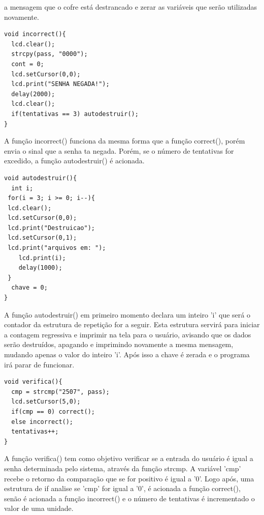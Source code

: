 \documentclass[conference]{IEEEtran}
\begin{document}
        a mensagem que o cofre está destrancado e zerar as variáveis
        que serão utilizadas novamente.        
        \begin{lstlisting}
void incorrect(){
  lcd.clear();
  strcpy(pass, "0000");
  cont = 0;
  lcd.setCursor(0,0);
  lcd.print("SENHA NEGADA!");
  delay(2000);
  lcd.clear();
  if(tentativas == 3) autodestruir();
}
        \end{lstlisting}
        A função incorrect() funciona da mesma forma que a função correct(), porém envia o sinal que a senha ta negada. Porém, se o número de tentativas for excedido, a função autodestruir() é acionada.
        \begin{lstlisting}
void autodestruir(){
  int i;
 for(i = 3; i >= 0; i--){ 
 lcd.clear();
 lcd.setCursor(0,0);
 lcd.print("Destruicao");
 lcd.setCursor(0,1);
 lcd.print("arquivos em: ");
 	lcd.print(i);
   	delay(1000);
 }
  chave = 0;
}
        \end{lstlisting}
        A função autodestruir() em primeiro momento declara um
        inteiro ’i’ que será o contador da estrutura de repetição for a
        seguir. Esta estrutura servirá para iniciar a contagem regressiva
        e imprimir na tela para o usuário, avisando que os dados
        serão destruídos, apagando e imprimindo novamente a mesma
        mensagem, mudando apenas o valor do inteiro ’i’. Após isso
        a chave é zerada e o programa irá parar de funcionar.
        \begin{lstlisting}
void verifica(){
  cmp = strcmp("2507", pass);
  lcd.setCursor(5,0);
  if(cmp == 0) correct();
  else incorrect();
  tentativas++;
}
        \end{lstlisting}
        A função verifica() tem como objetivo verificar se a entrada do usuário é igual a senha determinada pelo sistema, através da função strcmp.
        A variável 'cmp' recebe o retorno da comparação que se for positivo é igual a '0'. Logo após, uma estrutura de if analise se 'cmp' for igual a '0',
        é acionada a função correct(), senão é acionada a função incorrect() e o número de tentativas é incrementado o valor de uma unidade.
\end{document}
